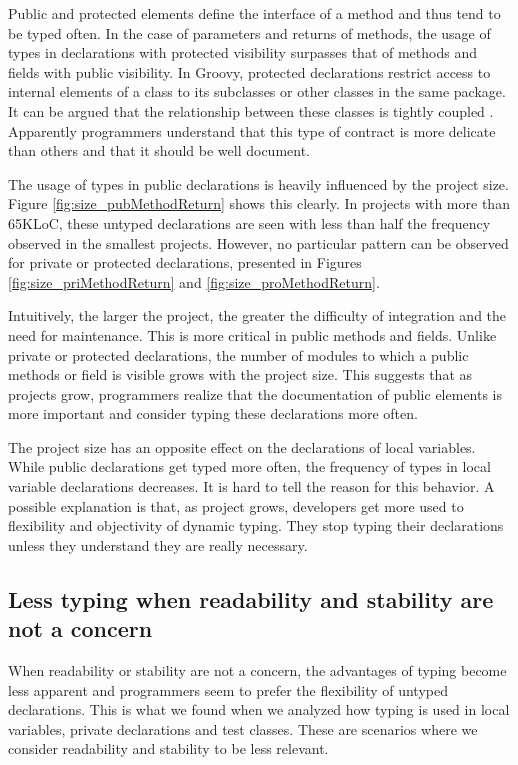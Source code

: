 \documentclass[preprint]{sigplanconf}
\begin{document}
Public and protected elements define the interface of a method and thus tend to be typed often.
In the case of parameters and returns of methods, the usage of types in declarations with protected visibility  surpasses that of methods and fields with public visibility.
In Groovy, protected declarations restrict access to internal elements of a class to its subclasses or other classes in the same package.
It can be argued that the relationship between these classes is tightly coupled \cite{Chidamber94}.
Apparently programmers understand that this type of contract is more delicate than others and that it should be well document.

The usage of types in public declarations is heavily influenced by the project size.
Figure \ref{fig:size_pubMethodReturn} shows this clearly.
In projects with more than 65KLoC, these untyped declarations are seen with less than half the frequency observed in the smallest projects.
However, no particular pattern can be observed for private or protected declarations, presented in Figures \ref{fig:size_priMethodReturn} and \ref{fig:size_proMethodReturn}.

Intuitively, the larger the project, the greater the difficulty of integration and the need for maintenance.
This is more critical in public methods and fields.
Unlike private or protected declarations, the number of modules to which a public methods or field is visible grows with the project size.
This suggests that as projects grow, programmers realize that the documentation of public elements is more important and consider typing these declarations more often.

The project size has an opposite effect on the declarations of local variables.
While public declarations get typed more often, the frequency of types in local variable declarations decreases.
It is hard to tell the reason for this behavior.
A possible explanation is that, as project grows, developers get more used to flexibility and objectivity of dynamic typing.
They stop typing their declarations unless they understand they are really necessary.

\subsection{Less typing when readability and stability are not a concern\label{discussion-q2}}
When readability or stability are not a concern, the advantages of typing become less apparent and  programmers seem to prefer the flexibility of untyped declarations.
This is what we found when we analyzed how typing is used in local variables, private declarations and test classes.
These are scenarios where we consider readability and stability to be less relevant.
\end{document}
